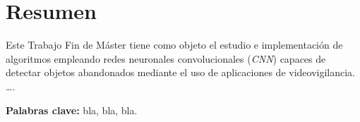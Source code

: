 
\chapter*{Resumen}
\label{cha:resumen}


Este Trabajo Fin de Máster tiene como objeto el estudio e implementación de algoritmos empleando redes neuronales convolucionales (\textit{CNN}) capaces de detectar objetos abandonados mediante el uso de aplicaciones de videovigilancia. \ldots.

\textbf{Palabras clave:} bla, bla, bla.